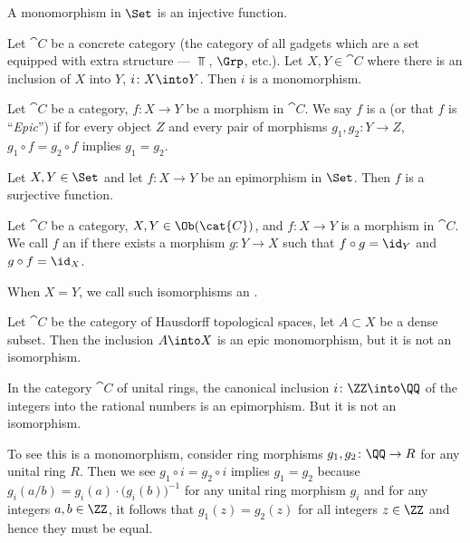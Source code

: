 \begin{example}
A monomorphism in $\Set$ is an injective function.
\end{example}

\begin{example}
Let $\cat{C}$ be a concrete category (the category of all gadgets
which are a set equipped with extra structure --- $\Top$, $\Grp$, etc.).
Let $X,Y\in\cat{C}$ where there is an inclusion of $X$ into $Y$,
$i\colon X\into Y$. Then $i$ is a monomorphism.
\end{example}

\begin{definition}[Epimorphisms]
Let $\cat{C}$ be a category, $f\colon X\to Y$ be a morphism in $\cat{C}$.
We say $f$ is a  (or that $f$ is ``\emph{Epic}'') if
for every object $Z$ and every pair of morphisms $g_{1},g_{2}\colon Y\to Z$,
$g_{1}\circ f=g_{2}\circ f$ implies $g_{1}=g_{2}$.
\end{definition}

\begin{example}
Let $X,Y\in\Set$ and let $f\colon X\to Y$ be an epimorphism in $\Set$.
Then $f$ is a surjective function.
\end{example}

\begin{definition}
Let $\cat{C}$ be a category, $X,Y\in\Ob(\cat{C})$, and $f\colon X\to Y$
is a morphism in $\cat{C}$. We call $f$ an  if
there exists a morphism $g\colon Y\to X$ such that $f\circ g=\id_{Y}$
and $g\circ f=\id_{X}$.

When $X=Y$, we call such isomorphisms an .
\end{definition}

\begin{example}
Let $\cat{C}$ be the category of Hausdorff topological spaces, let
$A\subset X$ be a dense subset. Then the inclusion $A\into X$ is an
epic monomorphism, but it is not an isomorphism.
\end{example}

\begin{example}
In the category $\cat{C}$ of unital rings, the canonical inclusion
$i\colon\ZZ\into\QQ$ of the integers into the rational numbers is an
epimorphism. But it is not an isomorphism.

To see this is a monomorphism, consider ring morphisms
$g_{1},g_{2}\colon\QQ\to R$ for any unital ring $R$. Then we see
$g_{1}\circ i=g_{2}\circ i$ implies $g_{1}=g_{2}$ because
$g_{i}(a/b)=g_{i}(a)\cdot\bigl(g_{i}(b)\bigr)^{-1}$ for any unital ring
morphism $g_{i}$ and for any integers $a,b\in\ZZ$, it follows that
$g_{1}(z)=g_{2}(z)$ for all integers $z\in\ZZ$ and hence they must be equal.
\end{example}

